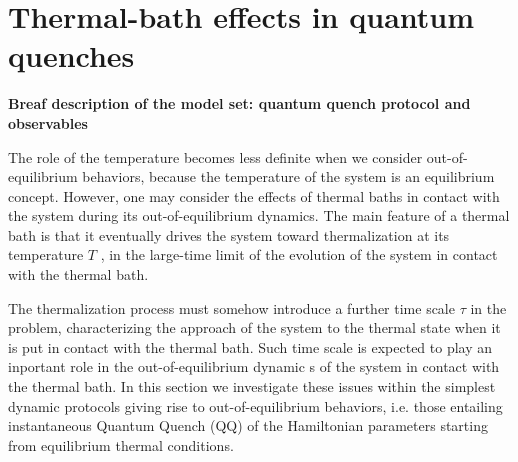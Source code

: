 \section{Thermal-bath effects in quantum quenches}

{\bf Breaf description of the model set: quantum quench protocol and observables}

The role of the temperature becomes less definite when
we consider out-of-equilibrium behaviors, because the
temperature of the system is an equilibrium concept.
However, one may consider the effects of thermal baths
in contact with the system during its out-of-equilibrium
dynamics. The main feature of a thermal bath is that
it eventually drives the system toward thermalization at
its temperature $T$ , in the large-time limit of the 
evolution of the system in contact with the thermal bath.


The thermalization process must somehow introduce a further
time scale $\tau$ in the problem, characterizing the approach
of the system to the thermal state when it is put in contact 
with the thermal bath. Such time scale is expected
to play an inportant role in the out-of-equilibrium dynamic
s of the system in contact with the thermal bath.
In this section we investigate these issues within the simplest
dynamic protocols giving rise to out-of-equilibrium
behaviors, i.e. those entailing instantaneous Quantum Quench (QQ) of the
Hamiltonian parameters starting from equilibrium thermal conditions.\\

